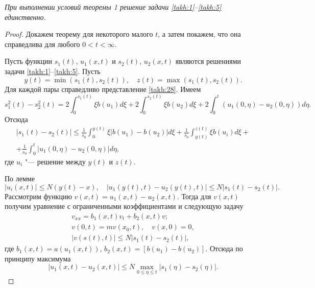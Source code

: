 \begin{theorem}[3]\sl При выполнении условий теоремы 1 решение
задачи \eqref{takh:1}--\eqref{takh:5} единственно{\rm .}
\end{theorem}

\begin{proof} Докажем  теорему для некоторого малого $t$, а затем покажем, что она справедлива для любого
$0<t<\infty$.

Пусть функции $s_1(t)$, $u_1(x,t)$ и $s_2(t)$, $u_2(x,t)$ являются
решениями задачи \eqref{takh:1}--\eqref{takh:5}. Пусть
$$
y(t)=\min(s_1(t),s_2(t)), \quad z(t)=\max(s_1(t),s_2(t)).
$$
Для каждой пары справедливо представление \eqref{takh:28}. Имеем
$$
s_1^2(t)-s_2^2(t)=2\int^{s_1(t)}_{0}\xi b(u_1)d\xi+2\int^{s_2(t)}_{0}\xi b(u_2)d\xi
+2\int^{t}_{0}(u_1(0,\eta)-u_2(0,\eta))d\eta.
$$
Отсюда
\begin{multline}
|s_1(t)-s_2(t)|\leq\frac{1}{s_0}\int^{y(t)}_{0}\xi|b(u_1)-b(u_2)|d\xi
+ \frac{1}{s_0}\int^{z(t)}_{y(t)}\xi b(u_i)d\xi +
\\
+\frac{1}{s_0}\int^{t}_{0}|u_1(0,\eta)-u_2(0,\eta)|d\eta,
\label{takh:29}
\end{multline}
где $u_i$ "--- решение между $y(t)$ и $z(t)$.

По лемме 
\begin{equation}
|u_i(x,t)|\leq N(y(t)-x),
\quad 
|u_1(y(t),t)-u_2(y(t),t)|\leq N|s_1(t)-s_2(t)|.
\label{takh:30}
\end{equation}
Рассмотрим функцию  $v(x,t)=u_1(x,t)-u_2(x,t)$. Тогда для $v(x,t)$
получим уравнение с ограниченными коэффициентами и следующую задачу
\begin{gather}
v_{xx}=b_1(x,t)v_t+b_2(x,t)v;
\\
v(0,t)=mv(x_0,t), \quad  v(x, 0)=0,\\
|v(s(t),t)|\leq N|s_1(t)-s_2(t)|, 
\end{gather}
где $b_1(x,t)=a(u_1(x,t))$, $b_2(x,t)=[b(u_1)-b(u_2)]$.
Отсюда по
принципу максимума $$|u_1(x,t)-u_2(x,t)|\leq N\max\limits_{0\leq
\eta \leq t}|s_1(\eta)-s_2(\eta)|.$$


\end{proof}
